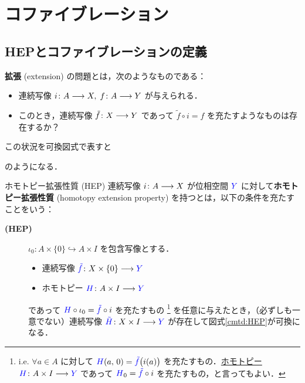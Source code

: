\documentclass[algtopo_main]{subfiles}
\begin{document}
\section{コファイブレーション}

\subsection{HEPとコファイブレーションの定義}

\textbf{拡張} (extension) の問題とは，次のようなものである：

\begin{itemize}
    \item 連続写像 $i \colon A \longrightarrow X,\; f \colon A \longrightarrow Y$ が与えられる．
    \item このとき，連続写像 $\tilde{f} \colon X \longrightarrow Y$ であって $\tilde{f} \circ i = f$ を充たすようなものは存在するか？
\end{itemize}
この状況を可換図式で表すと
\begin{center}
\end{center}
のようになる．

\begin{mydef}[label=def:HEP]{ホモトピー拡張性質 (HEP)}
    連続写像 $i \colon A \longrightarrow X$ が位相空間 $\textcolor{blue}{Y}$ に対して\textbf{ホモトピー拡張性質} (homotopy extension property) を持つとは，以下の条件を充たすことをいう：
    \begin{description}
        \item[\textbf{(HEP)}] $\iota_0 \colon A \times \{0\} \hookrightarrow A \times I$ を包含写像とする．
        \begin{itemize}
            \item 連続写像 $\textcolor{blue}{\tilde{f}} \colon X \times \{0\} \longrightarrow \textcolor{blue}{Y}$
            \item ホモトピー $\textcolor{blue}{H} \colon A \times I \longrightarrow \textcolor{blue}{Y}$
        \end{itemize}
        であって $\textcolor{blue}{H} \circ \iota_0 = \textcolor{blue}{\tilde{f}} \circ i$ を充たすもの
        \footnote{i.e. $\forall a \in A$ に対して $\textcolor{blue}{H}(a,\, 0) = \textcolor{blue}{\tilde{f}} \bigl( i(a) \bigr)$ を充たすもの．\hyperref[def:homotopy-basic]{ホモトピー} $\textcolor{blue}{H} \colon A \times I \longrightarrow \textcolor{blue}{Y}$ であって $\textcolor{blue}{H}_0 = \textcolor{blue}{\tilde{f}} \circ i$ を充たすもの，と言ってもよい．}
        を任意に与えたとき，（必ずしも一意でない）連続写像 $\textcolor{blue}{\tilde{H}} \colon X \times I \longrightarrow \textcolor{blue}{Y}$ が存在して図式\ref{cmtd:HEP}が可換になる．
    \end{description}
    
\end{mydef}
\end{document}
